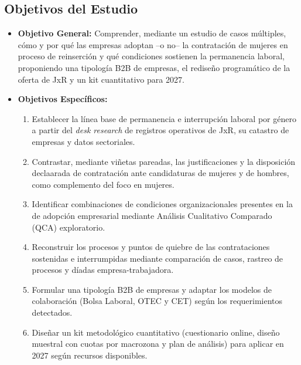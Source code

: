 \subsection{Objetivos del Estudio}
\begin{itemize}
    \item \textbf{Objetivo General:} Comprender, mediante un estudio de casos múltiples, cómo y por qué las empresas adoptan --o no-- la contratación de mujeres en proceso de reinserción y qué condiciones sostienen la permanencia laboral, proponiendo una tipología B2B de empresas, el rediseño programático de la oferta de JxR y un kit cuantitativo para 2027.
    \item \textbf{Objetivos Específicos:}
    \begin{enumerate}
        \item Establecer la línea base de permanencia e interrupción laboral por género a partir del \textit{desk research} de registros operativos de JxR, su catastro de empresas y datos sectoriales.
        \item Contrastar, mediante viñetas pareadas, las justificaciones y la disposición declaarada de contratación ante candidaturas de mujeres y de hombres, como complemento del foco en mujeres.
        \item Identificar combinaciones de condiciones organizacionales presentes en la de adopción empresarial mediante Análisis Cualitativo Comparado (QCA) exploratorio.
        \item Reconstruir los procesos y puntos de quiebre de las contrataciones sostenidas e interrumpidas mediante comparación de casos, rastreo de procesos y díadas empresa-trabajadora.
        \item Formular una tipología B2B de empresas y adaptar los modelos de colaboración (Bolsa Laboral, OTEC y CET) según los requerimientos detectados.
        \item Diseñar un kit metodológico cuantitativo (cuestionario online, diseño muestral con cuotas por macrozona y plan de análisis) para aplicar en 2027 según recursos disponibles.
    \end{enumerate}
\end{itemize}

